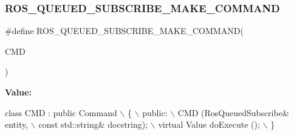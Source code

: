 \subsubsection{\texorpdfstring{R\+O\+S\+\_\+\+Q\+U\+E\+U\+E\+D\+\_\+\+S\+U\+B\+S\+C\+R\+I\+B\+E\+\_\+\+M\+A\+K\+E\+\_\+\+C\+O\+M\+M\+A\+ND}{ROS\_QUEUED\_SUBSCRIBE\_MAKE\_COMMAND}}
{\footnotesize\ttfamily \#define R\+O\+S\+\_\+\+Q\+U\+E\+U\+E\+D\+\_\+\+S\+U\+B\+S\+C\+R\+I\+B\+E\+\_\+\+M\+A\+K\+E\+\_\+\+C\+O\+M\+M\+A\+ND(\begin{DoxyParamCaption}\item[{}]{C\+MD }\end{DoxyParamCaption})}

{\bfseries Value\+:}
\begin{DoxyCode}
\textcolor{keyword}{class }CMD : \textcolor{keyword}{public} Command          \(\backslash\)
      \{                         \(\backslash\)
      public:                       \(\backslash\)
    CMD (RosQueuedSubscribe& entity,                \(\backslash\)
         \textcolor{keyword}{const} std::string& docstring);     \(\backslash\)
    virtual Value doExecute ();         \(\backslash\)
      \}
\end{DoxyCode}
